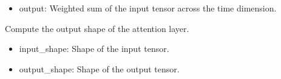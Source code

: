 \documentclass[letterpaper,10pt,english]{sphinxmanual}
\begin{document}
\begin{fulllineitems}
\begin{fulllineitems}
\begin{description}
\begin{itemize}
\end{itemize}

\begin{itemize}
\item {} 
\sphinxAtStartPar
output: Weighted sum of the input tensor across the time dimension.

\end{itemize}

\end{description}

\end{fulllineitems}


\begin{fulllineitems}
\label{\detokenize{lstm_attention_model:lstm_attention_model.AttentionLayer.compute_output_shape}}
\pysigstartsignatures
{}
\pysigstopsignatures
\sphinxAtStartPar
Compute the output shape of the attention layer.
\begin{description}
\begin{itemize}
\item {} 
\sphinxAtStartPar
input\_shape: Shape of the input tensor.

\end{itemize}

\begin{itemize}
\item {} 
\sphinxAtStartPar
output\_shape: Shape of the output tensor.

\end{itemize}

\end{description}

\end{fulllineitems}


\end{fulllineitems}

\end{document}
